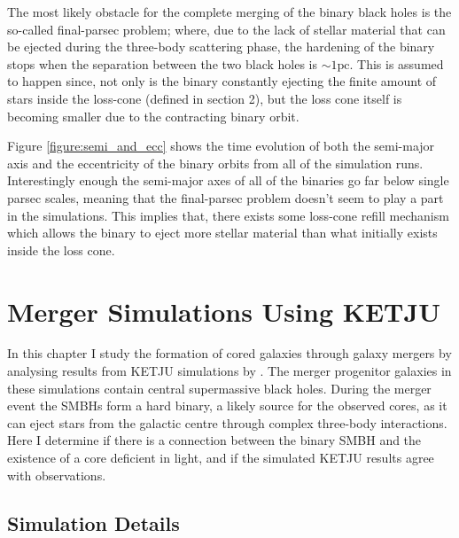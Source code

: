 \documentclass[english, oneside]{HYgradu}
\begin{document}

The most likely obstacle for the complete merging of the binary black holes is the so-called final-parsec problem; where, due to the lack of stellar material that can be ejected during the three-body scattering phase, the hardening of the binary stops when the separation between the two black holes is $\sim 1 \mathrm{pc}$. This is assumed to happen since, not only is the binary constantly ejecting the finite amount of stars inside the loss-cone (defined in section 2), but the loss cone itself is becoming smaller due to the contracting binary orbit.

Figure \ref{figure:semi_and_ecc} shows the time evolution of both the semi-major axis and the eccentricity of the binary orbits from all of the simulation runs. Interestingly enough the semi-major axes of all of the binaries go far below single parsec scales, meaning that the final-parsec problem doesn't seem to play a part in the simulations. This implies that, there exists some loss-cone refill mechanism which allows the binary to eject more stellar material than what initially exists inside the loss cone.



\chapter{Merger Simulations Using KETJU}

In this chapter I study the formation of cored galaxies through galaxy mergers by analysing results from KETJU simulations by \cite{Rantala2018}. The merger progenitor galaxies in these simulations contain central supermassive black holes. During the merger event the SMBHs form a hard binary, a likely source for the observed cores, as it can eject stars from the galactic centre through complex three-body interactions. Here I determine if there is a connection between the binary SMBH and the existence of a core deficient in light, and if the simulated KETJU results agree with observations.


\section{Simulation Details}
\end{document}
